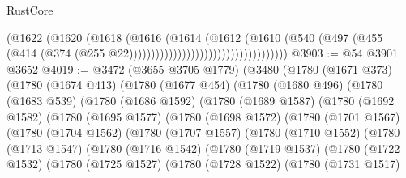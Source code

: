 \begin{lexlean}{RustCore}
\begin{coremodule}
                                                  (@1622
                                                    (@1620
                                                      (@1618
                                                        (@1616
                                                          (@1614
                                                            (@1612
                                                              (@1610
                                                                (@540
                                                                  (@497
                                                                    (@455
                                                                      (@414
                                                                        (@374
                                                                          (@255
                                                                            @22))))))))))))))))))))))))))))))))))))
@3903 := @54 @3901 @3652
@4019 := @3472
    (@3655 @3705 @1779)
    (@3480
      (@1780
        (@1671 @373)
        (@1780
          (@1674 @413)
          (@1780
            (@1677 @454)
            (@1780
              (@1680 @496)
              (@1780
                (@1683 @539)
                (@1780
                  (@1686 @1592)
                  (@1780
                    (@1689 @1587)
                    (@1780
                      (@1692 @1582)
                      (@1780
                        (@1695 @1577)
                        (@1780
                          (@1698 @1572)
                          (@1780
                            (@1701 @1567)
                            (@1780
                              (@1704 @1562)
                              (@1780
                                (@1707 @1557)
                                (@1780
                                  (@1710 @1552)
                                  (@1780
                                    (@1713 @1547)
                                    (@1780
                                      (@1716 @1542)
                                      (@1780
                                        (@1719 @1537)
                                        (@1780
                                          (@1722 @1532)
                                          (@1780
                                            (@1725 @1527)
                                            (@1780
                                              (@1728 @1522)
                                              (@1780
                                                (@1731 @1517)

\end{coremodule}
\end{lexlean}
